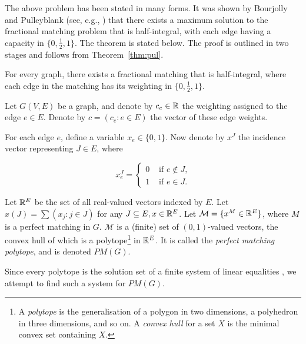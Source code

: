 The above problem has been stated in many forms. It was shown by Bourjolly and Pulleyblank (see, e.g., \cite{bour1989}) that there exists a maximum solution to the fractional matching problem that is half-integral, with each edge having a capacity in $\{0, \frac{1}{2}, 1 \}$. The theorem is stated below. The proof is outlined in two stages and follows from Theorem~\ref{thm:pul}.

\begin{theorem}
  For every graph, there exists a fractional matching that is half-integral, where each edge in the matching has its weighting in $\{0, \frac{1}{2}, 1 \}$.
\end{theorem}

Let $G(V, E)$ be a graph, and denote by $c_e \in \mathbb{R}$ the weighting assigned to the edge $e \in E$. Denote by $c = (c_e: e \in E)$ the vector of these edge weights.

For each edge $e$, define a variable $x_e \in \{ 0, 1 \}$. Now denote by $x^J$ the incidence vector representing $J \in E$, where

$$
x_e^J = \left\{ \begin{array}{rl}
 0 &\mbox{ if $e \notin J$,} \\
 1 &\mbox{ if $e \in J$.}
\end{array} \right.
$$

Let $\mathbb{R}^E$ be the set of all real-valued vectors indexed by $E$. Let $x(J) = \sum{ (x_j : j \in J) }$ for any $J \subseteq E, x \in \mathbb{R}^E$. Let $\mathcal{M} = \{ x^M \in \mathbb{R}^E \}$, where $M$ is a perfect matching in $G$. $\mathcal{M}$ is a (finite) set of $(0, 1)$-valued vectors, the convex hull of which is a polytope\footnote{A \emph{polytope} is the generalisation of a polygon in two dimensions, a polyhedron in three dimensions, and so on. A \emph{convex hull} for a set $X$ is the minimal convex set containing $X$.} in $\mathbb{R}^E$. It is called the \emph{perfect matching polytope}, and is denoted $PM(G)$. 

Since every polytope is the solution set of a finite system of linear equalities \cite{weyl1935}, we attempt to find such a system for $PM(G)$.

